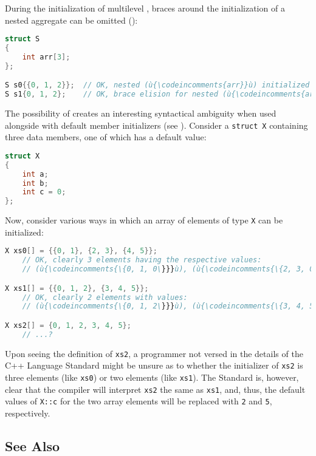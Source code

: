 During the initialization of multilevel , braces
around the initialization of a nested aggregate can be omitted
():

\begin{lstlisting}[language=C++]
struct S
{
    int arr[3];
};

S s0{{0, 1, 2}};  // OK, nested (ù{\codeincomments{arr}}ù) initialized explicitly
S s1{0, 1, 2};    // OK, brace elision for nested (ù{\codeincomments{arr}}ù)
\end{lstlisting}

\noindent The possibility of  creates an interesting
syntactical ambiguity when used alongside  with
default member initializers (see ). Consider a
\lstinline!struct!~\lstinline!X! containing three data members, one of which
has a default value:

\begin{lstlisting}[language=C++]
struct X
{
    int a;
    int b;
    int c = 0;
};
\end{lstlisting}

\noindent Now, consider various ways in which an array of elements of type
\lstinline!X! can be initialized:

\begin{lstlisting}[language=C++]
X xs0[] = {{0, 1}, {2, 3}, {4, 5}};
    // OK, clearly 3 elements having the respective values:
    // (ù{\codeincomments{\{0, 1, 0\}}}ù), (ù{\codeincomments{\{2, 3, 0\}}}ù), (ù{\codeincomments{\{4, 5, 0\}}}ù)

X xs1[] = {{0, 1, 2}, {3, 4, 5}};
    // OK, clearly 2 elements with values:
    // (ù{\codeincomments{\{0, 1, 2\}}}ù), (ù{\codeincomments{\{3, 4, 5\}}}ù)

X xs2[] = {0, 1, 2, 3, 4, 5};
    // ...?
\end{lstlisting}

\noindent Upon seeing the definition of \lstinline!xs2!, a programmer not versed in
the details of the C++ Language Standard might be unsure as to whether the
initializer of \lstinline!xs2! is three elements (like \lstinline!xs0!) or two
elements (like \lstinline!xs1!). The Standard is, however, clear that the
compiler will interpret \lstinline!xs2! the same as \lstinline!xs1!, and,
thus, the default values of \lstinline!X::c! for the two array elements
will be replaced with \lstinline!2! and \lstinline!5!, respectively.

\subsection[See Also]{See Also}\label{see-also}

